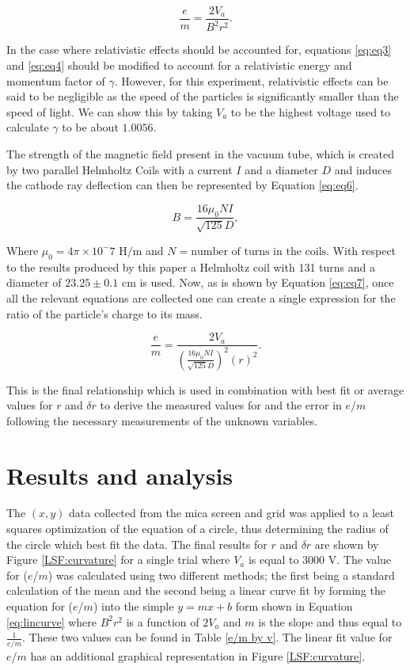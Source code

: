 \documentclass[prb,preprint]{revtex4-1}
\begin{document}
	\begin{equation}\label{eq:eq5}
		\frac{e}{m}=\frac{2V_a}{B^2r^2}.
	\end{equation}

In the case where relativistic effects should be accounted for, equations \eqref{eq:eq3} and \eqref{eq:eq4} should be modified to account for a relativistic energy and momentum factor of $\gamma$. However, for this experiment, relativistic effects can be said to be negligible as the speed of the particles is significantly smaller than the speed of light. We can show this by taking $V_a$ to be the highest voltage used to calculate $\gamma$ to be about $1.0056$.

\newpage

The strength of the magnetic field present in the vacuum tube, which is created by two parallel Helmholtz Coils with a current $I$ and a diameter $D$ and induces the cathode ray deflection can then be represented by Equation \eqref{eq:eq6}.

	\begin{equation}\label{eq:eq6}
		B=\frac{16\mu_0 N I}{\sqrt{125}D},
	\end{equation}

Where $\mu_0=4\pi\times10^-7 \mbox{ H/m}$ and $N=\mbox{number of turns in the coils}$. With respect to the results produced by this paper a Helmholtz coil with 131 turns and a diameter of $23.25\pm0.1$ cm is used. Now, as is shown by Equation \eqref{eq:eq7}, once all the relevant equations are collected one can create a single expression for the ratio of the particle's charge to its mass.

	\begin{equation}\label{eq:eq7}
		\frac{e}{m}=\frac{2V_a}{\left(\frac{16\mu_0 N I}{\sqrt{125}D}\right)^2\left(r\right)^2}.
	\end{equation}

This is the final relationship which is used in combination with best fit or average values for $r$ and $\delta r$ to derive the measured values for and the error in $e$/$m$ following the necessary measurements of the unknown variables.

\newpage

\section{Results and analysis}

The $(x,y)$ data collected from the mica screen and grid was applied to a least squares optimization of the equation of a circle, thus determining the radius of the circle which best fit the data. The final results for $r$ and $\delta r$ are shown by Figure \ref{LSF:curvature} for a single trial where $V_a$ is equal to 3000 V. The value for ($e$/$m$) was calculated using two different methods; the first being a standard calculation of the mean and the second being a linear curve fit by forming the equation for ($e$/$m$) into the  simple $y=mx+b$ form shown in Equation \eqref{eq:lincurve} where $B^2r^2$ is a function of $2V_a$ and $m$ is the slope and thus equal to $\frac{1}{e/m}$. These two values can be found in Table \ref{e/m by v}. The linear fit value for $e/m$ has an additional graphical representation in Figure \ref{LSF:curvature}.
\end{document}
